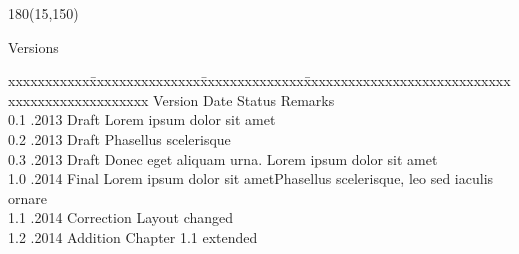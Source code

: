 
\begin{textblock}{180}(15,150)
\color{black}
\begin{huge}
Versions
\end{huge}
\vspace{10mm}

\fontsize{10pt}{18pt}\selectfont
\begin{tabbing}
xxxxxxxxxxx\=xxxxxxxxxxxxxxx\=xxxxxxxxxxxxxx\=xxxxxxxxxxxxxxxxxxxxxxxxxxxxxxxxxxxxxxxxxxxxxxx \kill
Version	\> Date	\> Status			\> Remarks		\\
0.1	.2013	\> Draft		\> Lorem ipsum dolor sit amet	\\	
0.2	.2013	\> Draft		\> Phasellus scelerisque	\\ 
0.3	.2013	\> Draft		\> Donec eget aliquam urna. Lorem ipsum dolor sit amet	\\ 
1.0	.2014	\> Final		\> Lorem ipsum dolor sit ametPhasellus scelerisque, leo sed iaculis ornare 	\\ 
1.1	.2014	\> Correction	\> Layout changed	\\
1.2	.2014	\> Addition		\> Chapter 1.1 extended	\\
\end{tabbing}

\end{textblock}
